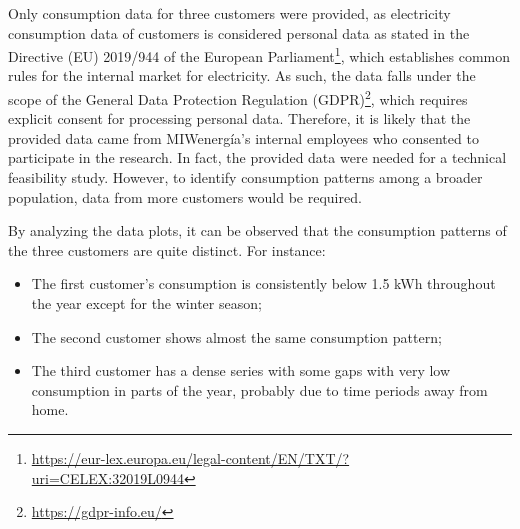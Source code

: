 Only consumption data for three customers were provided, as electricity consumption data of customers is considered personal data as stated in the Directive (EU) 2019/944 of the European Parliament\footnote{ \url{https://eur-lex.europa.eu/legal-content/EN/TXT/?uri=CELEX:32019L0944} }, which establishes common rules for the internal market for electricity.
As such, the data falls under the scope of the General Data Protection Regulation (GDPR)\footnote{ \url{https://gdpr-info.eu/} }, which requires explicit consent for processing personal data.
Therefore, it is likely that the provided data came from MIWenergía's internal employees who consented to participate in the research.
In fact, the provided data were needed for a technical feasibility study.
However, to identify consumption patterns among a broader population, data from more customers would be required.

By analyzing the data plots, it can be observed that the consumption patterns of the three customers are quite distinct.
For instance:
\begin{itemize}
  \item The first customer's consumption is consistently below 1.5 kWh throughout the year except for the winter season;
  \item The second customer shows almost the same consumption pattern;
  \item The third customer has a dense series with some gaps with very low consumption in parts of the year, probably due to time periods away from home.
\end{itemize}

